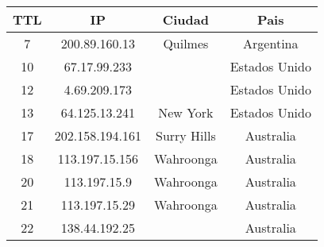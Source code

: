 \begin{tabular}{|c|c|c|c|}
	\hline
	TTL & IP & Ciudad & Pais \\
	\hline
	7 & 200.89.160.13 & Quilmes & Argentina \\
	\hline
	10 & 67.17.99.233 &  & Estados Unido \\
	\hline
	12 & 4.69.209.173 &  & Estados Unido \\
	\hline
	13 & 64.125.13.241 & New York & Estados Unido \\
	\hline
	17 & 202.158.194.161 & Surry Hills & Australia \\
	\hline
	18 & 113.197.15.156 & Wahroonga & Australia \\
	\hline
	20 & 113.197.15.9 & Wahroonga & Australia \\
	\hline
	21 & 113.197.15.29 & Wahroonga & Australia \\
	\hline
	22 & 138.44.192.25 &  & Australia \\
	\hline
\end{tabular}
